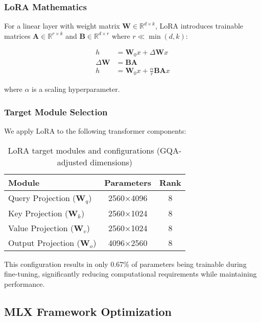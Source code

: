 \subsubsection{LoRA Mathematics}

For a linear layer with weight matrix $\mathbf{W} \in \mathbb{R}^{d \times k}$, LoRA introduces trainable matrices $\mathbf{A} \in \mathbb{R}^{r \times k}$ and $\mathbf{B} \in \mathbb{R}^{d \times r}$ where $r \ll \min(d,k)$:

\begin{align}
h &= \mathbf{W}_0 x + \Delta \mathbf{W} x \\
\Delta \mathbf{W} &= \mathbf{B}\mathbf{A} \\
h &= \mathbf{W}_0 x + \frac{\alpha}{r} \mathbf{B}\mathbf{A} x
\end{align}

where $\alpha$ is a scaling hyperparameter.

\subsubsection{Target Module Selection}

We apply LoRA to the following transformer components:

\begin{table}[H]
\centering
\begin{tabular}{lcc}
\toprule
Module & Parameters & Rank \\
\midrule
Query Projection ($\mathbf{W}_q$) & 2560×4096 & 8 \\
Key Projection ($\mathbf{W}_k$) & 2560×1024 & 8 \\
Value Projection ($\mathbf{W}_v$) & 2560×1024 & 8 \\
Output Projection ($\mathbf{W}_o$) & 4096×2560 & 8 \\
\bottomrule
\end{tabular}
\caption{LoRA target modules and configurations (GQA-adjusted dimensions)}
\label{tab:lora-modules}
\end{table}

This configuration results in only 0.67\% of parameters being trainable during fine-tuning, significantly reducing computational requirements while maintaining performance.

\subsection{MLX Framework Optimization}

